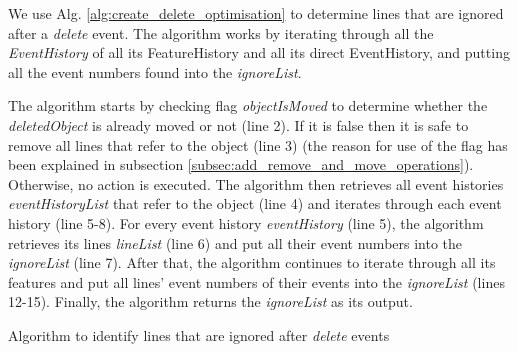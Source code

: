 \documentclass{llncs}
\begin{document}
We use Alg. \ref{alg:create_delete_optimisation} to determine lines that are ignored after a \emph{delete} event. The algorithm
works by iterating through all the \emph{EventHistory} of all its {FeatureHistory} and all its direct {EventHistory}, and putting all the event numbers found into the \emph{ignoreList}.

The algorithm starts by checking flag \emph{objectIsMoved} to determine whether the \emph{deletedObject} is already moved or not (line 2). If it is false then it is safe to remove all lines that refer to the object (line 3) (the reason for use of the flag has been explained in subsection \ref{subsec:add_remove_and_move_operations}). Otherwise, no action is executed. The algorithm then retrieves all event histories \emph{eventHistoryList} that refer to the object (line 4) and iterates through each event history (line 5-8). For every event history \emph{eventHistory} (line 5), the algorithm retrieves its lines \emph{lineList} (line 6) and put all their event numbers into the \emph{ignoreList} (line 7). After that, the algorithm continues to iterate through all its features and put all lines' event numbers of their events into the \emph{ignoreList} (lines 12-15). Finally, the algorithm returns the \emph{ignoreList} as its output.

\begin{algorithm}[H]
\begin{small}
\end{small}
\caption{Algorithm to identify lines that are ignored after \emph{delete} events}
\label{alg:create_delete_optimisation}
\end{algorithm}
\end{document}
